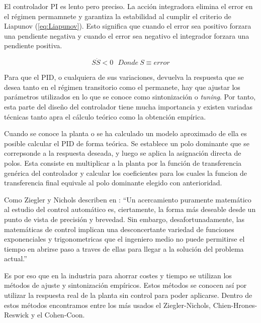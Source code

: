 \documentclass{book}
\begin{document}
El controlador PI es lento pero preciso. La acci\'on integradora elimina el error en el r\'egimen permamnete y garantiza la estabilidad al cumplir el criterio de Liapunov (\ref{eq:Liapunov}). Esto significa que cuando el error sea positivo forzara una pendiente negativa y cuando el error sea negativo el integrador forzara una pendiente positiva. \par

\begin{equation}\label{eq:Liapunov}
	S\dot S < 0 \ \ \ Donde \ S\equiv error
\end{equation} \par

Para que el PID, o cualquiera de sus variaciones, devuelva la respuesta que se desea tanto en el r\'egimen transitorio como el permanete, hay que ajustar los par\'ametros utilizados en lo que se conoce como sintonizaci\'on o \emph{tuning}. Por tanto, esta parte del diseño del controlador tiene mucha importancia y existen variadas t\'ecnicas tanto apra el c\'alculo te\'orico como la obtenci\'on emp\'irica. \par

Cuando se conoce la planta o se ha calculado un modelo aproximado de ella es posible calcular el PID de forma te\'orica. Se establece un polo dominante que se correpsonde a la respuesta deseada, y luego se aplica la asignaci\'on directa de polos. Esta consiste en multiplicar a la planta por la funci\'on de transferencia gen\'erica del controlador y calcular los coeficientes para los cuales la funcion de transferencia final equivale al polo dominante elegido con anterioridad. \par

Como Ziegler y Nichols describen en \cite{ZNoriginal}: ``Un acercamiento puramente matem\'atico al estudio del control autom\'atico es, ciertamente, la forma más deseable desde un punto de vista de precisi\'on y brevedad. Sin embargo, desafortunadamente, las matem\'aticas de control implican una desconcertante variedad de funciones exponenciales y trigonometricas que el ingeniero medio no puede permitirse el tiempo en abrirse paso a traves de ellas para llegar a la soluci\'on del problema actual.'' \par

Es por eso que en la industria para ahorrar costes y tiempo se utilizan los m\'etodos de ajuste y sintonizaci\'on emp\'iricos. Estos m\'etodos se conocen as\'i por utilizar la respuesta real de la planta sin control para poder aplicarse. Dentro de estos m\'etodos encontramos entre los m\'as usados el Ziegler-Nichols, Chien-Hrones-Reswick y el Cohen-Coon.\par
\end{document}
